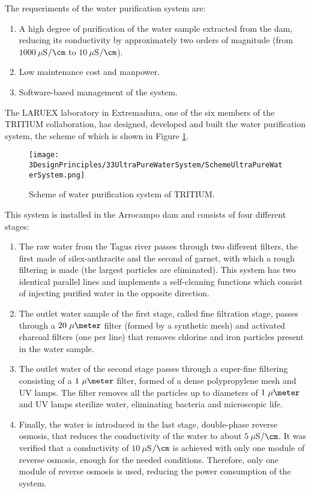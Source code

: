 The requeriments of the water purification system are:

\begin{enumerate}

\item{} A high degree of purification of the water sample extracted from the dam, reducing its conductivity by approximately two orders of magnitude (from $1000~\mu$S$/\cm$ to $10~\mu$S$/\cm$).

\item{} Low maintenance cost  and manpower.

\item{} Software-based management of the system.
\end{enumerate}

The LARUEX laboratory in Extremadura, one of the six members of the TRITIUM collaboration, has designed, developed and built the water purification system, the scheme of which is shown in Figure \ref{fig:WPSScheme}.

\begin{figure}[htbp]
\centering
\texttt{[image: 3DesignPrinciples/33UltraPureWaterSystem/SchemeUltraPureWaterSystem.png]}
\caption{Scheme of water purification system of TRITIUM.\label{fig:WPSScheme}}
\end{figure}

This system is installed in the Arrocampo dam and consists of four different stages:

\begin{enumerate}
\item{} The raw water from the Tagus river passes through two different filters, the first made of silex-anthracite and the second of garnet, with which a rough filtering is made (the largest particles are eliminated). This system has two identical parallel lines and implements a self-cleaning functions which consist of injecting purified water in the opposite direction.

\item{} The outlet water sample of the first stage, called fine filtration stage, passes through a $20~\mu\meter$ filter (formed by a synthetic mesh) and activated charcoal filters (one per line) that removes chlorine and iron particles present in the water sample.

\item{} The outlet water of the second stage passes through a super-fine filtering consisting of a $1~\mu\meter$ filter, formed of a dense polypropylene mesh and UV lamps. The filter removes all the particles up to diameters of $1~\mu\meter$ and UV lamps sterilize water, eliminating bacteria and microscopic life.

\item{} Finally, the water is introduced in the last stage, double-phase reverse osmosis, that reduces the conductivity of the water to about $5~\mu$S$/\cm$. It was verified that a conductivity of $10~\mu$S$/\cm$ is achieved with only one module of reverse osmosis, enough for the needed conditions. Therefore, only one module of reverse osmosis is used, reducing the power consumption of the system.

\end{enumerate}

